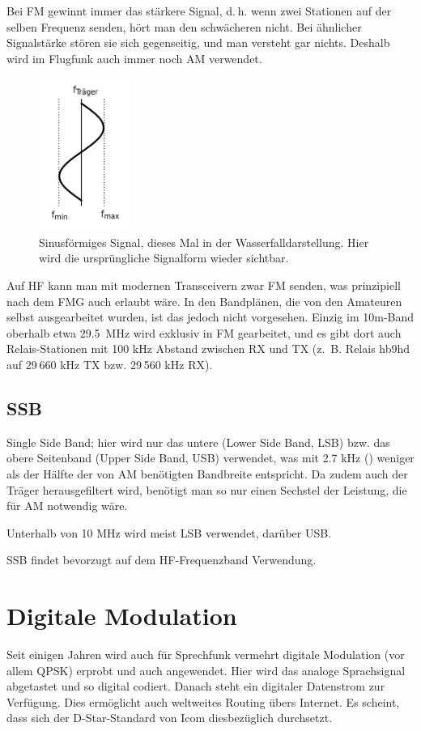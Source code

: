 Bei FM gewinnt immer das stärkere Signal, d. h. wenn zwei Stationen auf der selben Frequenz senden, hört man den schwächeren nicht. Bei ähnlicher Signalstärke stören sie sich gegenseitig, und man versteht gar nichts. Deshalb wird im Flugfunk auch immer noch AM verwendet.

\begin{figure}[h!]
 \centering
 \includegraphics[width=3cm]{./png/Amfu-FM-Wasserfall.png}
 \caption{Sinusförmiges Signal, dieses Mal in der Wasserfalldarstellung. Hier wird die ursprüngliche Signalform wieder sichtbar.}
 \label{fig:fmWaterfall}
\end{figure}

Auf HF kann man mit modernen Transceivern zwar FM senden, was prinzipiell nach dem FMG auch erlaubt wäre. In den Bandplänen, die von den Amateuren selbst ausgearbeitet wurden, ist das jedoch nicht vorgesehen. Einzig im 10m-Band oberhalb etwa 29.5 MHz wird exklusiv in FM gearbeitet, und es gibt dort auch Relais-Stationen mit 100 kHz Abstand zwischen RX und TX (z. B. Relais hb9hd auf 29 660 kHz TX bzw. 29 560 kHz RX).

\subsection{SSB}
Single Side Band; hier wird nur das untere (Lower Side Band, LSB) bzw. das obere Seitenband (Upper Side Band, USB) verwendet, was mit 2.7 kHz () weniger als der Hälfte der von AM benötigten Bandbreite entspricht. Da zudem auch der Träger herausgefiltert wird, benötigt man so nur einen Sechstel der Leistung, die für AM notwendig wäre.

Unterhalb von 10 MHz wird meist LSB verwendet, darüber USB.

SSB findet bevorzugt auf dem HF-Frequenzband Verwendung.

\section{Digitale Modulation}
Seit einigen Jahren wird auch für Sprechfunk vermehrt digitale Modulation (vor allem QPSK) erprobt und auch angewendet. Hier wird das analoge Sprachsignal abgetastet und so digital codiert. Danach steht ein digitaler Datenstrom zur Verfügung. Dies ermöglicht auch weltweites Routing übers Internet. Es scheint, dass sich der D-Star-Standard von Icom diesbezüglich durchsetzt.

